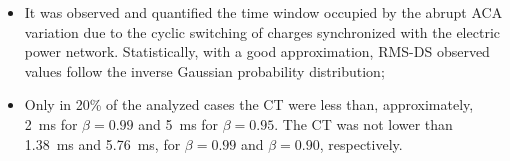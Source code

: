 \documentclass[journal]{IEEEtran}
\begin{document}
	\begin{itemize}
		
		\item It was observed and quantified the time window occupied by the abrupt \ac{ACA} variation due to the cyclic switching of charges synchronized with the electric power network. 
		Statistically, \color{blue} with a good approximation, \ac{RMS-DS} observed values follow the inverse Gaussian probability distribution; \color{black} 
		\item Only in 20\% of the analyzed cases the \ac{CT} \color{blue} were \color{black} less than, approximately, 2~ms for $\beta = 0.99$ and 5~ms for $\beta = 0.95$. 
		The \ac{CT} was not lower than 1.38~ms and 5.76~ms, for $\beta=0.99$ and $\beta = 0.90$, respectively.
	\end{itemize}
	
	
\end{document}
